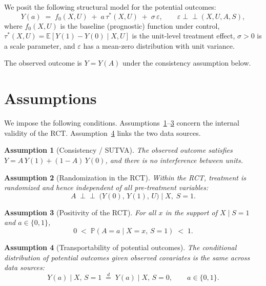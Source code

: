 \documentclass[11pt]{article}
\theoremstyle{plain}
\theoremstyle{definition}
\theoremstyle{remark}
\newcommand{\E}{\mathbb{E}}
\newcommand{\1}{\mathds{1}}
\newcommand{\p}{\mathbb{P}}
\theoremstyle{plain}
\newtheorem{assumption}{Assumption}
\theoremstyle{remark}
\newcommand{\indep}{\perp\!\!\!\!\!\perp}
\newcommand{\eqd}{\overset{d}{=}}
\newcommand{\CATE}{\tau}
\begin{document}
We posit the following structural model for the potential outcomes:
\begin{equation}\label{eq:structural}
  Y(a) \;=\; f_0(X, U) \;+\; a\,\CATE^*(X, U) \;+\; \sigma\,\varepsilon,
  \qquad \varepsilon \indep (X, U, A, S),
\end{equation}
where $f_0(X,U)$ is the baseline (prognostic) function under control, $\CATE^*(X,U) = \E[Y(1) - Y(0) \mid X, U]$ is the unit-level treatment effect, $\sigma > 0$ is a scale parameter, and $\varepsilon$ has a mean-zero distribution with unit variance.

The observed outcome is $Y = Y(A)$ under the consistency assumption below.

\section{Assumptions}

We impose the following conditions. Assumptions~\ref{as:sutva}--\ref{as:positivity_rct} concern the internal validity of the RCT. Assumption~\ref{as:transport} links the two data sources.

\begin{assumption}[Consistency / SUTVA]\label{as:sutva}
  The observed outcome satisfies $Y = A\,Y(1) + (1-A)\,Y(0)$, and there is no interference between units.
\end{assumption}

\begin{assumption}[Randomization in the RCT]\label{as:rct_unconf}
  Within the RCT, treatment is randomized and hence independent of all pre-treatment variables:
  \begin{equation}\label{eq:rct_unconf}
    A \;\indep\; \bigl(Y(0),\, Y(1),\, U\bigr) \;\Big|\; X,\; S=1.
  \end{equation}
\end{assumption}

\begin{assumption}[Positivity of the RCT]\label{as:positivity_rct}
  For all $x$ in the support of $X \mid S=1$ and $a \in \{0,1\}$,
  \begin{equation}
    0 \;<\; \p(A = a \mid X = x,\, S = 1) \;<\; 1.
  \end{equation}
\end{assumption}

\begin{assumption}[Transportability of potential outcomes]\label{as:transport}
  The conditional distribution of potential outcomes given observed covariates is the same across data sources:
  \begin{equation}\label{eq:transport}
    Y(a) \mid X,\, S = 1 \;\eqd\; Y(a) \mid X,\, S = 0, \qquad a \in \{0,1\}.
  \end{equation}
\end{assumption}
\end{document}
